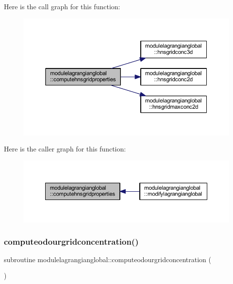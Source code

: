 Here is the call graph for this function\+:\nopagebreak
\begin{figure}[H]
\begin{center}
\leavevmode
\includegraphics[width=350pt]{namespacemodulelagrangianglobal_a9448f83b93f06396188a1d8aac9725f8_cgraph}
\end{center}
\end{figure}
Here is the caller graph for this function\+:\nopagebreak
\begin{figure}[H]
\begin{center}
\leavevmode
\includegraphics[width=350pt]{namespacemodulelagrangianglobal_a9448f83b93f06396188a1d8aac9725f8_icgraph}
\end{center}
\end{figure}
\mbox{\label{namespacemodulelagrangianglobal_ac0a32c3b1f02a2a6ba502620bfc58fa6}} 
\subsubsection{\texorpdfstring{computeodourgridconcentration()}{computeodourgridconcentration()}}
{\footnotesize\ttfamily subroutine modulelagrangianglobal\+::computeodourgridconcentration (\begin{DoxyParamCaption}{ }\end{DoxyParamCaption})\hspace{0.3cm}{\ttfamily [private]}}

